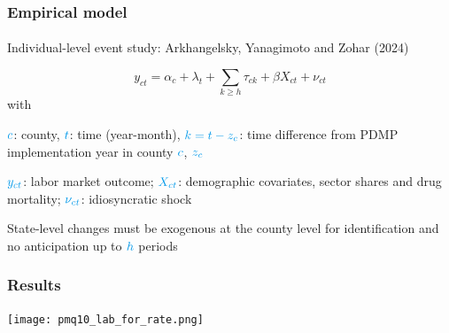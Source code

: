 
\begin{frame}

    \frametitle{Empirical model} %
    \framesubtitle{}  %
    \rmfamily %
    
    \begin{wideitemize}
        \item Individual-level event study: \textcolor{fgre}{Arkhangelsky, Yanagimoto and Zohar (2024)}
    \end{wideitemize}
    
    \begin{equation*}
        y_{ct} = \alpha_c + \lambda_t + \sum_{k\geq h}\tau_{ck} + \beta X_{ct} + \nu_{ct}
    \end{equation*}
    with 
    \vspace{9pt}
    \begin{wideitemize}
        \item[\textcolor{fblu}{\textbullet}] \(\textcolor{fblu}{c}\): county, \(\textcolor{fblu}{t}\): time (year-month), \(\textcolor{fblu}{k = t - z_c}\): time difference from PDMP implementation year in county \(\textcolor{fblu}{c}\), \(\textcolor{fblu}{z_c}\)
        \item[\textcolor{fblu}{\textbullet}] \(\textcolor{fblu}{y_{ct}}\): labor market outcome; \(\textcolor{fblu}{X_{ct}}\): demographic covariates, sector shares and drug mortality; \(\textcolor{fblu}{\nu_{ct}}\): idiosyncratic shock 
    \end{wideitemize}
    \vspace{9pt}
    State-level changes must be exogenous at the county level for \textcolor{fblu}{identification} and no anticipation up to \(\textcolor{fblu}{h}\) periods
    
\end{frame}

\begin{frame}

    \label{lab_force_rate_result}
    \frametitle{Results} %
    \framesubtitle{}  %
    \rmfamily %
    
    \begin{center} %
        \texttt{[image: pmq10\_lab\_for\_rate.png]}
    \end{center}

    \hyperlink{perc_comparison_3}{}
    \hyperlink{ta_3}{}
    \hyperlink{presc_3}{}

\end{frame}

